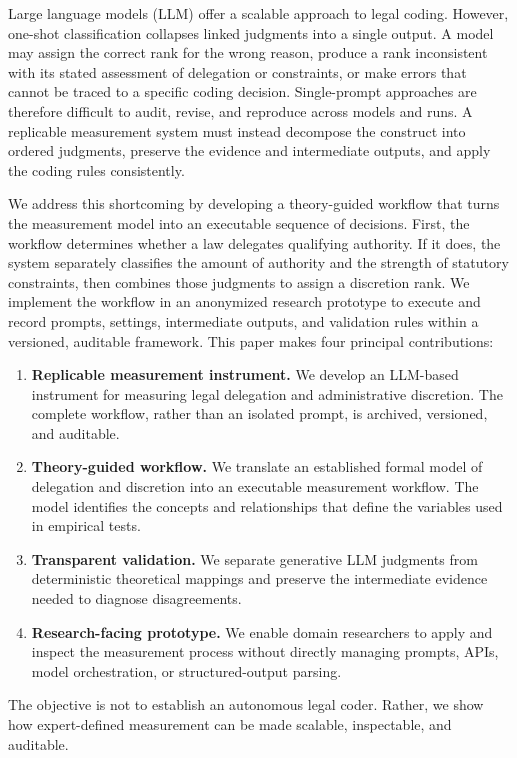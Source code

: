 \documentclass[runningheads]{llncs}
\newcommand{\systemname}{an anonymized research prototype}
\begin{document}
Large language models (LLM) offer a scalable approach to legal coding. However, one-shot classification collapses linked judgments into a single output. A model may assign the correct rank for the wrong reason, produce a rank inconsistent with its stated assessment of delegation or constraints, or make errors that cannot be traced to a specific coding decision. Single-prompt approaches are therefore difficult to audit, revise, and reproduce across models and runs. A replicable measurement system must instead decompose the construct into ordered judgments, preserve the evidence and intermediate outputs, and apply the coding rules consistently.

We address this shortcoming by developing a theory-guided workflow that turns the measurement model into an executable sequence of decisions. First, the workflow determines whether a law delegates qualifying authority. If it does, the system separately classifies the amount of authority and the strength of statutory constraints, then combines those judgments to assign a discretion rank. We implement the workflow in \systemname{} to execute and record prompts, settings, intermediate outputs, and validation rules within a versioned, auditable framework. This paper makes four principal contributions:
\begin{enumerate}[nosep,leftmargin=*]
    \item \textbf{Replicable measurement instrument.} We develop an LLM-based instrument for measuring legal delegation and administrative discretion. The complete workflow, rather than an isolated prompt, is archived, versioned, and auditable.
    \item \textbf{Theory-guided workflow.} We translate an established formal model of delegation and discretion into an executable measurement workflow. The model identifies the concepts and relationships that define the variables used in empirical tests.
    \item \textbf{Transparent validation.} We separate generative LLM judgments from deterministic theoretical mappings and preserve the intermediate evidence needed to diagnose disagreements.
    \item \textbf{Research-facing prototype.} We enable domain researchers to apply and inspect the measurement process without directly managing prompts, APIs, model orchestration, or structured-output parsing.
\end{enumerate}

\noindent The objective is not to establish an autonomous legal coder. Rather, we show how expert-defined measurement can be made scalable, inspectable, and auditable.
\vspace{-0.2 cm}
\end{document}
